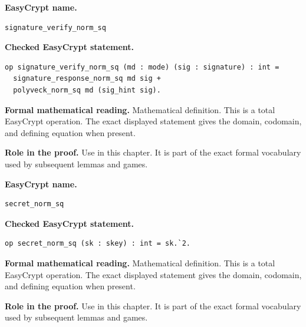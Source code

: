 \begin{formaldefinition}
\noindent\textbf{EasyCrypt name.}
\begin{lstlisting}[language=EasyCrypt,basicstyle=\ttfamily\scriptsize]
signature_verify_norm_sq
\end{lstlisting}
\noindent\textbf{Checked EasyCrypt statement.}
\begin{lstlisting}[language=EasyCrypt,basicstyle=\ttfamily\scriptsize]
op signature_verify_norm_sq (md : mode) (sig : signature) : int =
  signature_response_norm_sq md sig +
  polyveck_norm_sq md (sig_hint sig).
\end{lstlisting}
\noindent\textbf{Formal mathematical reading.}
Mathematical definition. This is a total EasyCrypt operation.  The exact displayed statement gives the domain, codomain, and defining equation when present.

\noindent\textbf{Role in the proof.}
Use in this chapter. It is part of the exact formal vocabulary used by subsequent lemmas and games.

\end{formaldefinition}

\begin{formaldefinition}
\noindent\textbf{EasyCrypt name.}
\begin{lstlisting}[language=EasyCrypt,basicstyle=\ttfamily\scriptsize]
secret_norm_sq
\end{lstlisting}
\noindent\textbf{Checked EasyCrypt statement.}
\begin{lstlisting}[language=EasyCrypt,basicstyle=\ttfamily\scriptsize]
op secret_norm_sq (sk : skey) : int = sk.`2.
\end{lstlisting}
\noindent\textbf{Formal mathematical reading.}
Mathematical definition. This is a total EasyCrypt operation.  The exact displayed statement gives the domain, codomain, and defining equation when present.

\noindent\textbf{Role in the proof.}
Use in this chapter. It is part of the exact formal vocabulary used by subsequent lemmas and games.

\end{formaldefinition}

